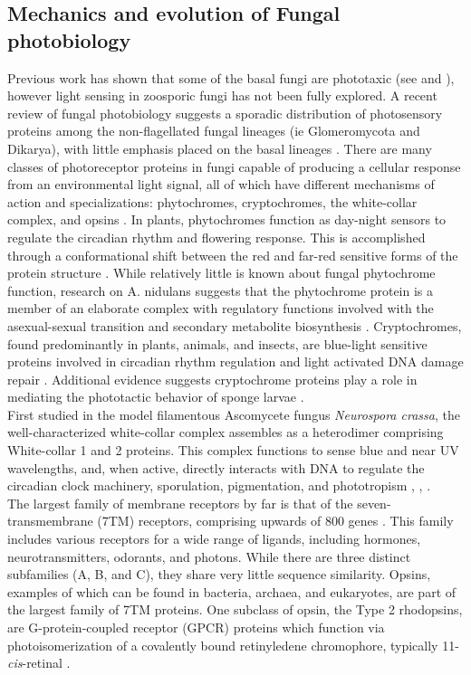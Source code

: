 \subsection{Mechanics and evolution of Fungal photobiology}
\indent Previous work has shown that some of the basal fungi are phototaxic (see \cite{Saranak1997} and \cite{Muehlstein1987}), however light sensing in zoosporic fungi has not been fully explored. A recent review of fungal photobiology suggests a sporadic distribution of photosensory proteins among the non-flagellated fungal lineages (ie Glomeromycota and Dikarya), with little emphasis placed on the basal lineages \cite{Idnurm2010}. There are many classes of photoreceptor proteins in fungi capable of producing a cellular response from an environmental light signal, all of which have different mechanisms of action and specializations: phytochromes, cryptochromes, the white-collar complex, and opsins \cite{Idnurm2010}. In plants, phytochromes function as day-night sensors to regulate the circadian rhythm and flowering response. This is accomplished through a conformational shift between the red and far-red sensitive forms of the protein structure \cite{Rockwell2006}. While relatively little is known about fungal phytochrome function, research on A. nidulans suggests that the phytochrome protein is a member of an elaborate complex with regulatory functions involved with the asexual-sexual transition and secondary metabolite biosynthesis \cite{Idnurm2010}. Cryptochromes, found predominantly in plants, animals, and insects, are blue-light sensitive proteins involved in circadian rhythm regulation and light activated DNA damage repair \cite{Idnurm et al. 2010}. Additional evidence suggests cryptochrome proteins play a role in mediating the phototactic behavior of sponge larvae \cite{Rivera2012}.\\
\indent First studied in the model filamentous Ascomycete fungus \textit{Neurospora crassa}, the well-characterized white-collar complex assembles as a heterodimer comprising White-collar 1 and 2 proteins. This complex functions to sense blue and near UV wavelengths, and, when active, directly interacts with DNA to regulate the circadian clock machinery, sporulation, pigmentation, and phototropism \cite{Ballario1997}, \cite{Purschwitz2006}, \cite{Corrochano2007}. \\
\indent The largest family of membrane receptors by far is that of the seven-transmembrane (7TM) receptors, comprising upwards of 800 genes \cite{Pierce2002}. This family includes various receptors for a wide range of ligands, including hormones, neurotransmitters, odorants, and photons. While there are three distinct subfamilies (A, B, and C), they share very little sequence similarity. Opsins, examples of which can be found in bacteria, archaea, and eukaryotes, are part of the largest family of 7TM proteins. One subclass of opsin, the Type 2 rhodopsins, are G-protein-coupled receptor (GPCR) proteins which function via photoisomerization of a covalently bound retinyledene chromophore, typically 11-\textit{cis}-retinal \cite{Wald1968}.\\
